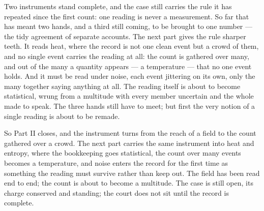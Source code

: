 Two instruments stand complete, and the case still carries the rule it has repeated since the first count: one
reading is never a measurement. So far that has meant two hands, and a third still coming, to be brought to one
number --- the tidy agreement of separate accounts. The next part gives the rule sharper teeth. It reads heat,
where the record is not one clean event but a crowd of them, and no single event carries the reading at all: the
count is gathered over many, and out of the many a quantity appears --- a temperature --- that no one event
holds. And it must be read under noise, each event jittering on its own, only the many together saying anything
at all. The reading itself is about to become statistical, wrung from a multitude with every member uncertain
and the whole made to speak. The three hands still have to meet; but first the very notion of a single reading
is about to be remade.

So Part II closes, and the instrument turns from the reach of a field to the count gathered over a crowd. The
next part carries the same instrument into heat and entropy, where the bookkeeping goes statistical, the count
over many events becomes a temperature, and noise enters the record for the first time as something the reading
must survive rather than keep out. The field has been read end to end; the count is about to become a multitude.
The case is still open, its charge conserved and standing; the court does not sit until the record is complete.

